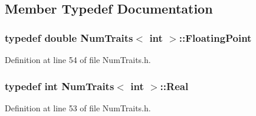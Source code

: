 \subsection{Member Typedef Documentation}
\hypertarget{struct_num_traits_3_01int_01_4_abcf7772310a2687a5faf8c3cf36896d2}{
\subsubsection[{Floating\-Point}]{\setlength{\rightskip}{0pt plus 5cm}typedef {\bf double} {\bf Num\-Traits}$<$ {\bf int} $>$\-::{\bf Floating\-Point}}}\label{struct_num_traits_3_01int_01_4_abcf7772310a2687a5faf8c3cf36896d2}


Definition at line 54 of file Num\-Traits.\-h.

\hypertarget{struct_num_traits_3_01int_01_4_af384e7a7ef8f1bd98e94de1cbcfc9b51}{
\subsubsection[{Real}]{\setlength{\rightskip}{0pt plus 5cm}typedef {\bf int} {\bf Num\-Traits}$<$ {\bf int} $>$\-::{\bf Real}}}\label{struct_num_traits_3_01int_01_4_af384e7a7ef8f1bd98e94de1cbcfc9b51}


Definition at line 53 of file Num\-Traits.\-h.



